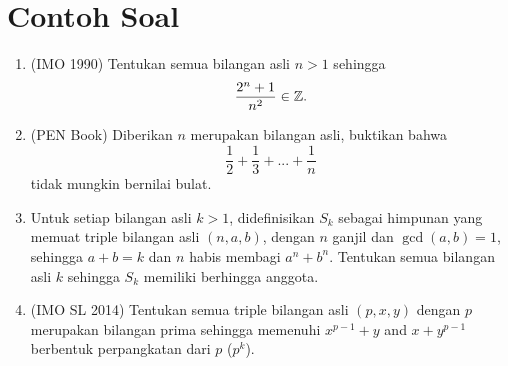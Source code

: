 \documentclass[11pt]{scrartcl}
\begin{document}
\section{Contoh Soal}
\begin{enumerate}
\item (IMO 1990) Tentukan semua bilangan asli $n > 1$ sehingga 
    \begin{align*}
        \dfrac{2^n+1}{n^2} \in \mathbb Z.
    \end{align*}
\item (PEN Book) Diberikan $n$ merupakan bilangan asli, buktikan bahwa
\[\frac{1}{2} + \frac{1}{3} +...+ \frac{1}{n}\]
tidak mungkin bernilai bulat.

\item Untuk setiap bilangan asli $k>1$, didefinisikan $S_k$ sebagai himpunan yang memuat triple bilangan asli $(n,a,b)$, dengan $n$ ganjil dan $\gcd (a,b)=1$, sehingga $a+b=k$ dan $n$ habis membagi $a^n+b^n$. Tentukan semua bilangan asli $k$ sehingga $S_k$ memiliki berhingga anggota.

\item (IMO SL 2014) Tentukan semua triple bilangan asli $(p, x, y)$ dengan $p$ merupakan bilangan prima sehingga memenuhi $x^{p -1} + y$ and $x + y^ {p -1}$ berbentuk perpangkatan dari $p$ ($p^k$). 
\end{enumerate}
\end{document}

